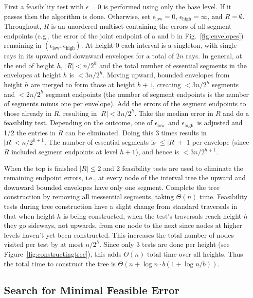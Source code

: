 \documentclass[11pt]{article}
\newcommand{\epslow}{\ensuremath{\epsilon_\mathrm{low}}}
\newcommand{\epshigh}{\ensuremath{\epsilon_\mathrm{high}}}
\newcommand{\epsinterval}[1]{\ensuremath{(\epslow,\epshigh#1}}
\begin{document}
First a feasibility test with $\epsilon = 0$ is performed using only the base level.
If it passes then the algorithm is done.
Otherwise, set $\epslow = 0$, $\epshigh = \infty$, and $R=\emptyset$.
Throughout, $R$ is an unordered multiset containing the errors of all segment endpoints (e.g., the error of the joint endpoint of \textsf{a} and \textsf{b} in Fig.~\ref{fig:envelopes}) remaining in \epsinterval{)}.
At height 0 each interval is a singleton, with single rays in its upward and downward envelopes for a total of $2n$ rays.
In general, at the end of height $h$, $|R| < n/2^h$ and the total number of essential segments in the envelopes at height $h$ is $< 3n/2^h$.
Moving upward, bounded envelopes from height $h$ are merged to form those at height $h+1$, creating
$ < 3n/2^{h}$ segments and $< 2n/2^h$ segment endpoints (the number of segment endpoints is the number of segments minus one per envelope).
Add the errors of the segment endpoints to those already in $R$, resulting in $|R| < 3n/2^h$.
Take the median error in $R$ and do a feasibility test.
Depending on the outcome, one of \epslow\ and \epshigh\ is adjusted and 1/2 the entries in $R$ can be eliminated.
Doing this 3 times results in $|R| < n/2^{h+1}$.
The number of essential segments is $\leq |R| + $ 1 per envelope (since $R$ included segment endpoints at level $h+1$), and hence is $< 3n/2^{h+1}$.

When the top is finished $|R| \leq 2$ and 2 feasibility tests are used to eliminate the remaining endpoint errors, i.e., at every node of the interval tree the upward and downward bounded envelopes have only one segment.
Complete the tree construction by removing all inessential segments, taking $\Theta(n)$ time.
Feasibility tests during tree construction have a slight change from standard traversals in that when height $h$ is being constructed, when the test's traversals reach height $h$ they go sideways, not upwards, from one node to the next since nodes at higher levels haven't yet been constructed.
This increases the total number of nodes visited per test by at most $n/2^h$.
Since only 3 tests are done per height (see Figure~\ref{fig:constructingtree}), this adds $\Theta(n)$ total time over all heights.
Thus the total time to construct the tree is $\Theta(n + \log n \cdot b(1 + \log n/b))$.



\subsection{Search for Minimal Feasible Error} \label{sec:SortedMatrix}
\end{document}
